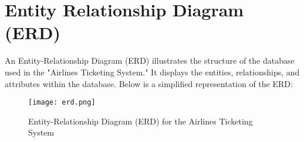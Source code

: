 \section{Entity Relationship Diagram (ERD)}
An Entity-Relationship Diagram (ERD) illustrates the structure of the database used in the "Airlines Ticketing System." It displays the entities, relationships, and attributes within the database. Below is a simplified representation of the ERD:

\begin{figure}[h]
    \centering
    \texttt{[image: erd.png]} %
    \caption{Entity-Relationship Diagram (ERD) for the Airlines Ticketing System}
    \label{fig:erd}
\end{figure}




\clearpage